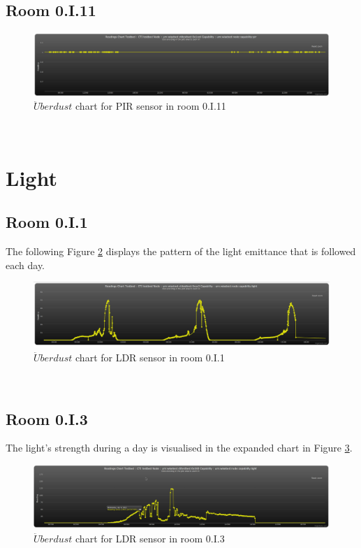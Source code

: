 \documentclass[12pt,a4paper]{report}
\begin{document}
\subsection{Room 0.I.11}
%
\begin{figure}[H]
\centering
	\includegraphics*[width=\textwidth]{pir_11}
	\caption{$\ddot{U}berdust$ chart for PIR sensor in room 0.I.11}
	\label{chart_pir_11}
\end{figure}
\ \\
%
\section{Light}
%
\subsection{Room 0.I.1}
%
The following Figure \ref{chart_light_1} displays the pattern of the light emittance that is followed each day.
\begin{figure}[H]
\centering
	\includegraphics*[width=\textwidth]{light_1}
	\caption{$\ddot{U}berdust$ chart for LDR sensor in room 0.I.1}
	\label{chart_light_1}
\end{figure}
\ \\
%
\subsection{Room 0.I.3}
%
The light's strength during a day is visualised in the expanded chart in Figure \ref{chart_light_3}.
\begin{figure}[H]
\centering
	\includegraphics*[width=\textwidth]{light_3}
	\caption{$\ddot{U}berdust$ chart for LDR sensor in room 0.I.3}
	\label{chart_light_3}
\end{figure}
\ \\
%
\end{document}
